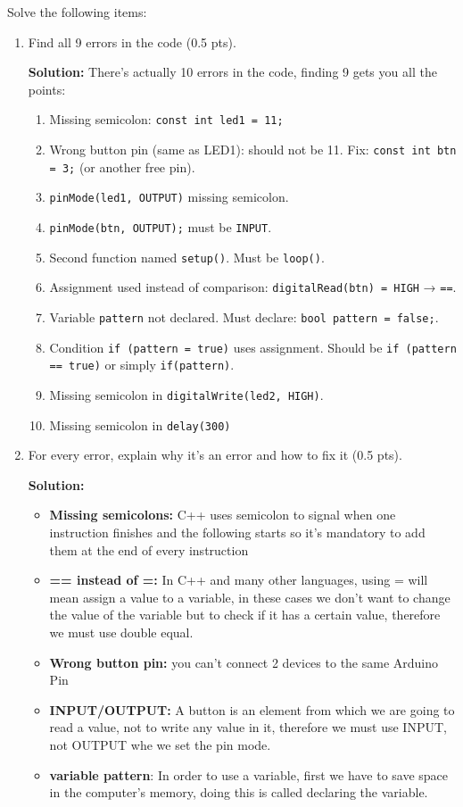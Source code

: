 \documentclass[10pt]{article}
\begin{document}
Solve the following items:
\begin{enumerate}
    \item Find all 9 errors in the code (0.5 pts).

    \textbf{Solution:}
    There's actually 10 errors in the code, finding 9 gets you all the points:
    \begin{enumerate}
        \item Missing semicolon: \verb|const int led1 = 11;|
        \item Wrong button pin (same as LED1): should not be 11.  
        Fix: \verb|const int btn = 3;| (or another free pin).
        \item \verb|pinMode(led1, OUTPUT)| missing semicolon.
        \item \verb|pinMode(btn, OUTPUT);| must be \verb|INPUT|.
        \item Second function named \texttt{setup()}. Must be \texttt{loop()}.
        \item Assignment used instead of comparison: \verb|digitalRead(btn) = HIGH| → \verb|==|.
        \item Variable \texttt{pattern} not declared. Must declare: \verb|bool pattern = false;|.
        \item Condition \verb|if (pattern = true)| uses assignment. Should be \verb|if (pattern == true)| or simply \verb|if(pattern)|.
        \item Missing semicolon in \verb|digitalWrite(led2, HIGH)|.
        \item Missing semicolon in \verb|delay(300)|
    \end{enumerate}

    \item For every error, explain why it’s an error and how to fix it (0.5 pts).

    \textbf{Solution:}
    \begin{itemize}
        \item \textbf{Missing semicolons:} C++ uses semicolon to signal when one instruction finishes and the following starts so it's mandatory to add them at the end of every instruction
        \item \textbf{== instead of =:} In C++ and many other languages, using = will mean assign a value to a variable, in these cases we don't want to change the value of the variable but to check if it has a certain value, therefore we must use double equal.
        \item \textbf{Wrong button pin:} you can't connect 2 devices to the same Arduino Pin
        \item \textbf{INPUT/OUTPUT:} A button is an element from which we are going to read a value, not to write any value in it, therefore we must use INPUT, not OUTPUT whe we set the pin mode.
        \item \textbf{variable pattern}: In order to use a variable, first we have to save space in the computer's memory, doing this is called declaring the variable.
    \end{itemize}
    

\end{enumerate}
\end{document}
